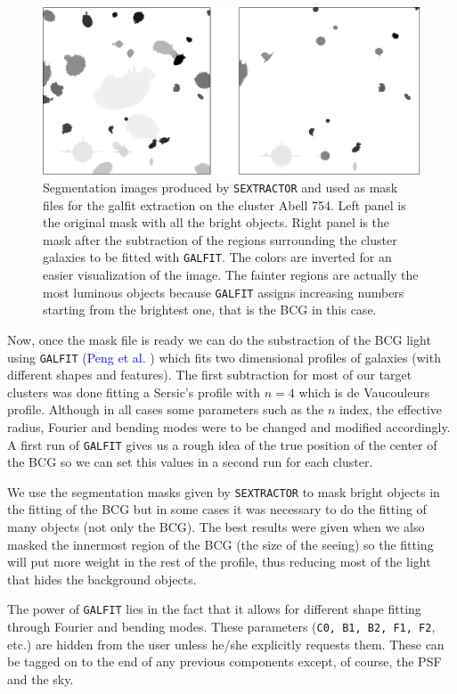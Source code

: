 \begin{figure}[H]
\centering
\includegraphics[width=15cm]{images/masks.png}
\caption[Segmentation images]{Segmentation images produced by \texttt{SEXTRACTOR} and used as mask files for the galfit extraction on the cluster Abell 754. Left panel is the original mask with all the bright objects. Right panel is the mask after the subtraction of the regions surrounding the cluster galaxies to be fitted with \texttt{GALFIT}. The colors are inverted for an easier visualization of the image. The fainter regions are actually the most luminous objects because \texttt{GALFIT} assigns increasing numbers starting from the brightest one, that is the BCG in this case.}
\end{figure}

Now, once the mask file is ready we can do the substraction of the BCG light using \texttt{GALFIT} (\textcolor{blue}{Peng et al.} \citeyear{Reference20}) which fits two dimensional profiles of galaxies (with different shapes and features). The first subtraction for most of our target clusters was done fitting a Sersic's profile with $n=4$ which is de Vaucouleurs profile. Although in all cases some parameters such as the $n$ index, the effective radius, Fourier and bending modes were to be changed and modified accordingly. A first run of \texttt{GALFIT} gives us a rough idea of the true position of the center of the BCG so we can set this values in a second run for each cluster. 

We use the segmentation masks given by \texttt{SEXTRACTOR} to mask bright objects in the fitting of the BCG but in some cases it was necessary to do the fitting of many objects (not only the BCG). The best results were given when we also masked the innermost region of the BCG (the size of the seeing) so the fitting will put more weight in the rest of the profile, thus reducing most of the light that hides the background objects.

The power of \texttt{GALFIT} lies in the fact that it allows for different shape fitting through Fourier and bending modes. These parameters (\texttt{C0, B1, B2, F1, F2}, etc.) are hidden from the user unless he/she explicitly requests them.  These can be tagged on to the end of any previous components except, of course, the PSF and the sky.  

